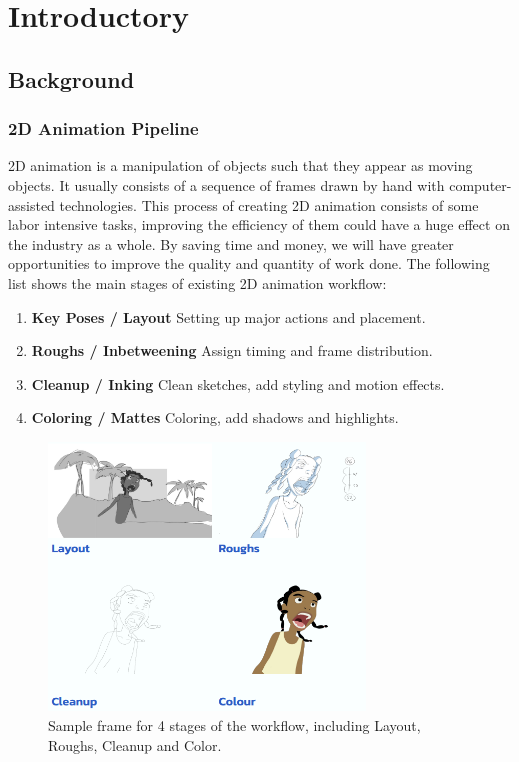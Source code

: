\chapter{Introductory}
\label{chapterlabel1}
\section{Background}

\subsection{2D Animation Pipeline}
2D animation is a manipulation of objects such that they appear as moving objects. It usually consists of a sequence of frames drawn by hand with computer-assisted technologies. This process of creating 2D animation consists of some labor intensive tasks, improving the efficiency of them could have a huge effect on the industry as a whole. By saving time and money, we will have greater opportunities to improve the quality and quantity of work done.  The following list shows the main stages of existing 2D animation workflow:

\begin{enumerate}
    \item \textbf{Key Poses / Layout} Setting up major actions and placement.
    \item \textbf{Roughs / Inbetweening} Assign timing and frame distribution.
    \item \textbf{Cleanup / Inking} Clean sketches, add styling and motion effects.
    \item \textbf{Coloring / Mattes} Coloring, add shadows and highlights.
\end{enumerate}

\begin{figure}
    \centering
    \includegraphics[width=0.75\textwidth]{images/introduction/stages.png}
    \caption{Sample frame for 4 stages of the workflow, including Layout, Roughs, Cleanup and Color.} 
    \label{fig:stages}
\end{figure}


